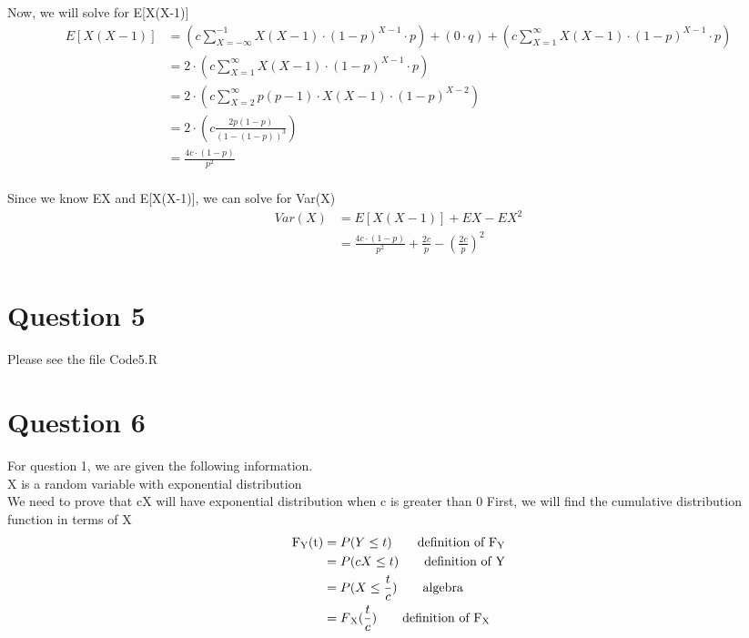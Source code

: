 \documentclass{article}
\numberwithin{equation}{section}
\newcommand{\eqname}[1]{\tag*{#1}}%
\begin{document}
Now, we will solve for E[X(X-1)]
\begin{align} 
	    \label{E[X(X-1)]}
		E[X(X-1)] &=  (c \sum_{X=-\infty}^{-1} X(X-1) \cdot (1-p)^{X-1}\cdot p) + (0 \cdot q) + (c \sum_{X=1}^{\infty}X(X-1) \cdot (1-p)^{X-1} \cdot p) \eqname{} \\
		&= 2 \cdot (c \sum_{X=1}^{\infty}X(X-1) \cdot (1-p)^{X-1} \cdot p) \eqname{} \\
		&= 2 \cdot (c \sum_{X=2}^{\infty}p(p-1) \cdot X(X-1) \cdot (1-p)^{X-2}) \eqname{Factor out (1-p)} \\
    	&= 2 \cdot (c \frac{2p(1-p)}{(1-(1-p))^3}) \eqname{2nd Derivative of Geometric Series} \\
    	&= \frac{4c \cdot (1-p)}{p^2} \eqname{Algebra} \\
\end{align}

Since we know EX and E[X(X-1)], we can solve for Var(X) 
\begin{align} 
	    \label{Var(X)}
		Var(X) &= E[X(X-1)] + EX - EX^2 \eqname{} \\
		&= \frac{4c \cdot (1-p)}{p^2} + \frac{2c}{p} - (\frac{2c}{p})^2 \eqname{} \\
\end{align}

\section{Question 5}

Please see the file Code5.R

\section{Question 6}

For question 1, we are given the following information.
\\ \indent 
X is a random variable with exponential distribution
\\ \indent 
We need to prove that cX will have exponential distribution when c is greater than 0
First, we will find the cumulative distribution function in terms of X
\begin{align} 
	    \label{F_Y(t)}
		\text{F\textsubscript{Y}(t)} &=  P(Y \leq t) \eqname{definition of F\textsubscript{Y}} \\
		&= P(cX \leq t) \eqname{definition of Y} \\
		&= P(X \leq \frac{t}{c}) \eqname{algebra} \\
		&= F\textsubscript{X}(\frac{t}{c}) \eqname{definition of F\textsubscript{X}} \\
\end{align}
\end{document}
